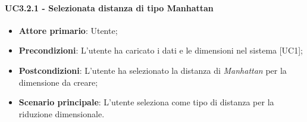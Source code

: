 \paragraph{UC3.2.1 - Selezionata distanza di tipo Manhattan}
\begin{itemize}
	\item \textbf{Attore primario}: Utente;
	\item \textbf{Precondizioni}: L'utente ha caricato i dati e le dimensioni nel sistema [UC1];
	\item \textbf{Postcondizioni}: L'utente ha selezionato la distanza di \textit{Manhattan} per la dimensione da creare;
	\item \textbf{Scenario principale}: L'utente seleziona  come tipo di distanza per la riduzione dimensionale.
\end{itemize}
